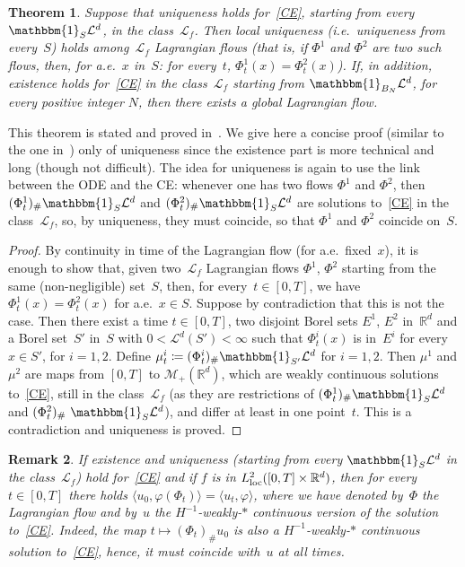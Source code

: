 \documentclass[a4paper,10pt]{article}
\newtheorem{theorem}{Theorem}[section]
\newtheorem{remark}[theorem]{Remark}
\newcommand\1{\mathbbm{1}}
\newcommand{\mc}{\mathcal}
\newcommand{\lan}{\langle}
\newcommand{\ran}{\rangle}
\newcommand\loc{{\rm loc}}
\numberwithin{equation}{section}
\begin{document}
\begin{theorem}\label{Lagrthm}
Suppose that uniqueness holds for~\eqref{CE}, starting from every $ \1_S \mc{L}^d$, in the class~$\mc{L}_f$. Then local uniqueness \textup{(}i.e.~uniqueness from every~$S$\textup{)} holds among~$\mc{L}_f$ Lagrangian flows \textup{(}that is, if $\Phi^1$ and $\Phi^2$ are two such flows, then, for a.e.~$x$ in~$S$: for every~$t$, $\Phi_t^1(x)=\Phi_t^2(x)$\textup{)}. If, in addition, existence holds for~\eqref{CE} in the class~$\mc{L}_f$ starting from $ \1_{B_N} \mc{L}^d$, for every positive integer $N$, then there exists a global Lagrangian flow.
\end{theorem}

This theorem is stated and proved in~\cite[Theorem 18]{AMBCRI08}. We give here a concise proof (similar to the one in~\cite{AMBCRI08}) only of uniqueness since the existence part is more technical and long (though not difficult). The idea for uniqueness is again to use the link between the ODE and the CE: whenever one has two flows $\Phi^1$ and $\Phi^2$, then $(\Phi^1_t)_\# \1_S \mc{L}^d$ and $(\Phi^2_t)_\# \1_S \mc{L}^d$ are solutions to~\eqref{CE} in the class~$\mc{L}_f$, so, by uniqueness, they must coincide, so that $\Phi^1$ and $\Phi^2$ coincide on~$S$.

\begin{proof}
By continuity in time of the Lagrangian flow (for a.e.~fixed~$x$), it is enough to show that, given two~$\mc{L}_f$ Lagrangian flows $\Phi^1$, $\Phi^2$ starting from the same (non-negligible) set~$S$, then, for every~$t \in [0,T]$, we have $\Phi^1_t(x)=\Phi^2_t(x)$ for a.e.~$x \in S$. Suppose by contradiction that this is not the case. Then there exist a time $t \in [0,T]$, two disjoint Borel sets $E^1$, $E^2$ in~$\mathbb{R}^d$ and a Borel set~$S'$ in~$S$ with $0<\mc{L}^d(S')<\infty$ such that $\Phi_t^i(x)$ is in~$E^i$ for every~$x \in S'$, for $i=1,2$. Define $\mu^i_t \coloneqq (\Phi^i_t)_\# \1_{S'} \mc{L}^d$ for $i=1,2$. Then $\mu^1$ and $\mu^2$ are maps from $[0,T]$ to $\mc{M}_+(\mathbb{R}^d)$, which are weakly continuous solutions to~\eqref{CE}, still in the class~$\mc{L}_f$ (as they are restrictions of $(\Phi^1_t)_\# \1_S \mc{L}^d$ and $(\Phi^2_t)_\# \ \1_S \mc{L}^d$), and differ at least in one point~$t$. This is a contradiction and uniqueness is proved.
\end{proof}

\begin{remark}\label{lagr_repr}
If existence and uniqueness \textup{(}starting from every $ \1_S \mc{L}^d$ in the class~$\mc{L}_f$\textup{)} hold for~\eqref{CE} and if $f$ is in $L^2_{\loc}([0,T]\times\mathbb{R}^d)$, then for every~$t \in [0,T]$ there holds $\lan u_0,\varphi(\Phi_t)\ran = \lan u_t,\varphi\ran$, where we have denoted by~$\Phi$ the Lagrangian flow and by~$u$ the $H^{-1}$-weakly-$*$ continuous version of the solution to~\eqref{CE}. Indeed, the map $t\mapsto (\Phi_t)_\#u_0$ is also a $H^{-1}$-weakly-$*$ continuous solution to~\eqref{CE}, hence, it must coincide with~$u$ at all times.
\end{remark}
\end{document}
